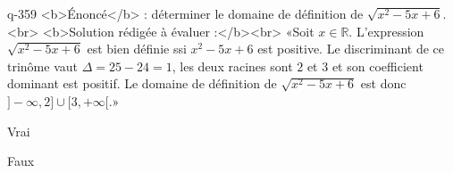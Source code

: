 \begin{truefalse}{q-359}
<b>Énoncé</b> : déterminer le domaine de définition de $\sqrt{x^2-5x+6}$.<br> <b>Solution rédigée à évaluer :</b><br>  «Soit $x\in\mathbb{R}$.  L'expression $\sqrt{x^2-5x+6}$ est bien définie ssi $x^2-5x+6$ est positive. Le discriminant de ce trinôme vaut $\Delta = 25-24=1$, les deux racines sont $2$ et $3$ et son coefficient dominant est positif. Le domaine de définition de $\sqrt{x^2-5x+6}$ est donc $]-\infty,2]\cup[3,+\infty[$.»
\item* Vrai
\item Faux
\end{truefalse}

